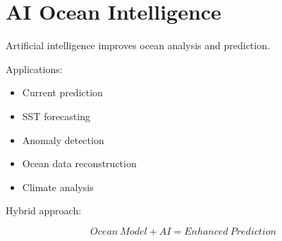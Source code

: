 \section{AI Ocean Intelligence}


Artificial intelligence improves ocean analysis and prediction.



Applications:


\begin{itemize}

\item Current prediction

\item SST forecasting

\item Anomaly detection

\item Ocean data reconstruction

\item Climate analysis

\end{itemize}



Hybrid approach:


\[
Ocean\ Model + AI
=
Enhanced\ Prediction
\]
